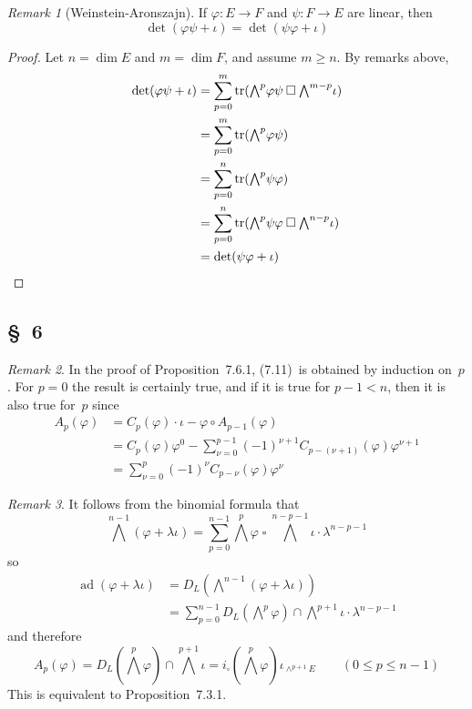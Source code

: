 \documentclass[letterpaper,12pt]{article}
\DeclareMathOperator{\ad}{ad}
\DeclareMathOperator{\tr}{tr}
\newcommand{\sect}{\cap}
\newcommand{\after}{\circ}
\newcommand{\mult}{\cdot}
\newcommand{\eprod}{\wedge}
\newcommand{\bigeprod}{\bigwedge}
\newcommand{\medeprod}{{\textstyle\bigeprod}}
\newcommand{\bprod}{\mathbin{\square}}
\theoremstyle{definition}
\theoremstyle{remark}
\newtheorem*{rmk}{Remark}
\begin{document}
\begin{rmk}[Weinstein-Aronszajn]
If \(\varphi:E\to F\) and \(\psi:F\to E\) are linear, then
\[\det(\varphi\psi+\iota)=\det(\psi\varphi+\iota)\]
\end{rmk}
\begin{proof}
Let \(n=\dim E\) and \(m=\dim F\), and assume \(m\ge n\). By remarks above,
\begin{align*}
\det(\varphi\psi+\iota)&=\sum_{p=0}^m\tr(\medeprod^p\varphi\psi\bprod\medeprod^{m-p}\iota)\\
	&=\sum_{p=0}^m\tr(\medeprod^p\varphi\psi)\\
	&=\sum_{p=0}^n\tr(\medeprod^p\psi\varphi)\\
	&=\sum_{p=0}^n\tr(\medeprod^p\psi\varphi\bprod\medeprod^{n-p}\iota)\\
	&=\det(\psi\varphi+\iota)\qedhere
\end{align*}
\end{proof}

\subsection*{\S~6}
\begin{rmk}
In the proof of Proposition~7.6.1, (7.11)~is obtained by induction on~\(p\). For \(p=0\) the result is certainly true, and if it is true for \(p-1<n\), then it is also true for~\(p\) since
\begin{align*}
A_p(\varphi)&=C_p(\varphi)\mult\iota-\varphi\after A_{p-1}(\varphi)\\
	&=C_p(\varphi)\varphi^0-\sum_{\nu=0}^{p-1}(-1)^{\nu+1}C_{p-(\nu+1)}(\varphi)\varphi^{\nu+1}\\
	&=\sum_{\nu=0}^p(-1)^{\nu}C_{p-\nu}(\varphi)\varphi^{\nu}
\end{align*}
\end{rmk}

\begin{rmk}
It follows from the binomial formula that
\[\medeprod^{n-1}(\varphi+\lambda\iota)=\sum_{p=0}^{n-1}\medeprod^p\varphi\bprod\medeprod^{n-p-1}\iota\mult\lambda^{n-p-1}\]
so
\begin{align*}
\ad(\varphi+\lambda\iota)&=D_L(\medeprod^{n-1}(\varphi+\lambda\iota))\\
	&=\sum_{p=0}^{n-1}D_L(\medeprod^p\varphi)\sect\medeprod^{p+1}\iota\mult\lambda^{n-p-1}
\end{align*}
and therefore
\[A_p(\varphi)=D_L(\medeprod^p\varphi)\sect\medeprod^{p+1}\iota=i_{\bprod}(\medeprod^p\varphi)\iota_{\eprod^{p+1}E}\qquad(0\le p\le n-1)\]
This is equivalent to Proposition~7.3.1.
\end{rmk}
\end{document}
